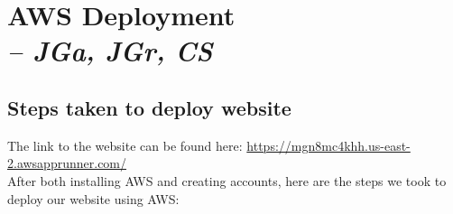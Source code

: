 \chapter[AWS Deployment]{AWS Deployment \\
\small{\textit{-- JGa, JGr, CS}}
\label{Chapter::AWSDeployment}}

\section{Steps taken to deploy website}

The link to the website can be found here: \url{https://mgn8mc4khh.us-east-2.awsapprunner.com/}
\\
After both installing AWS and creating accounts, here are the steps we took to deploy our website using AWS:

